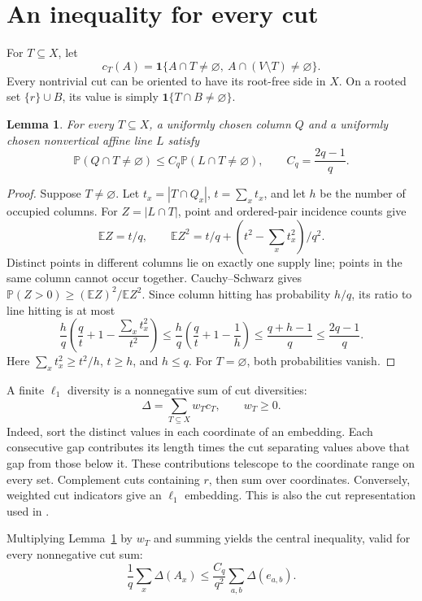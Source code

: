 \documentclass[11pt]{article}
\newtheorem{lemma}[theorem]{Lemma}
\newcommand{\E}{\mathbb E}
\newcommand{\Prob}{\mathbb P}
\newcommand{\ind}{\mathbf 1}
\begin{document}
\section{An inequality for every cut}
For $T\subseteq X$, let
\[
 c_T(A)=\ind\{A\cap T\ne\varnothing,\ A\cap(V\setminus T)\ne\varnothing\}.
\]
Every nontrivial cut can be oriented to have its root-free side in $X$.
On a rooted set $\{r\}\cup B$, its value is simply
$\ind\{T\cap B\ne\varnothing\}$.

\begin{lemma}\label{lem:hit}
For every $T\subseteq X$, a uniformly chosen column $Q$ and a uniformly
chosen nonvertical affine line $L$ satisfy
\[
 \Prob(Q\cap T\ne\varnothing)
 \le C_q\Prob(L\cap T\ne\varnothing),\qquad C_q=\frac{2q-1}{q}.
\]
\end{lemma}
\begin{proof}
Suppose $T\ne\varnothing$. Let $t_x=|T\cap Q_x|$, $t=\sum_x t_x$,
and let $h$ be the number of occupied columns. For $Z=|L\cap T|$,
point and ordered-pair incidence counts give
\[
 \E Z=t/q,\qquad
 \E Z^2=t/q+(t^2-\sum_x t_x^2)/q^2.
\]
Distinct points in different columns lie on exactly one supply line;
points in the same column cannot occur together. Cauchy--Schwarz gives
$\Prob(Z>0)\ge(\E Z)^2/\E Z^2$. Since column hitting has probability
$h/q$, its ratio to line hitting is at most
\[
 \frac hq\left(\frac qt+1-\frac{\sum_x t_x^2}{t^2}\right)
 \le\frac hq\left(\frac qt+1-\frac1h\right)
 \le\frac{q+h-1}{q}\le\frac{2q-1}{q}.
\]
Here $\sum_x t_x^2\ge t^2/h$, $t\ge h$, and $h\le q$.
For $T=\varnothing$, both probabilities vanish.
\end{proof}

A finite $\ell_1$ diversity is a nonnegative sum of cut diversities:
\begin{equation}\label{eq:cuts}
 \Delta=\sum_{T\subseteq X}w_Tc_T,\qquad w_T\ge0.
\end{equation}
Indeed, sort the distinct values in each coordinate of an embedding.
Each consecutive gap contributes its length times the cut separating
values above that gap from those below it. These contributions telescope
to the coordinate range on every set. Complement cuts containing $r$,
then sum over coordinates. Conversely, weighted cut indicators give
an $\ell_1$ embedding. This is also the cut representation used in
\cite{BT,JS}.

Multiplying Lemma~\ref{lem:hit} by $w_T$ and summing yields the central
inequality, valid for every nonnegative cut sum:
\begin{equation}\label{eq:average}
 \frac1q\sum_x\Delta(A_x)
 \le \frac{C_q}{q^2}\sum_{a,b}\Delta(e_{a,b}).
\end{equation}
\end{document}
